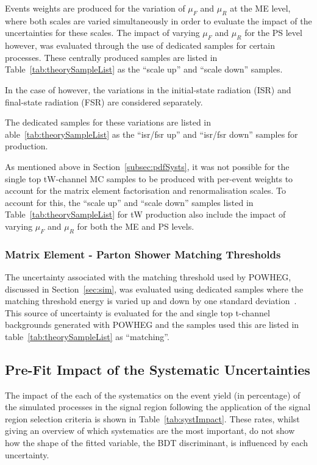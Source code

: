 Events weights are produced for the variation of $\mu_{F}$ and $\mu_{R}$ at the ME level, where both scales are varied simultaneously in order to evaluate the impact of the uncertainties for these scales.
The impact of varying $\mu_{F}$ and $\mu_{R}$ for the PS level however, was evaluated through the use of dedicated samples for certain processes.
These centrally produced samples are listed in Table~\ref{tab:theorySampleList} as the ``scale up'' and ``scale down'' samples. 

In the case of \ttbar however, the variations in the initial-state radiation (ISR) and final-state radiation (FSR) are considered separately.

The dedicated samples for these variations are listed in able~\ref{tab:theorySampleList} as the ``isr/fsr up'' and ``isr/fsr down'' samples for \ttbar production.

As mentioned above in Section~\ref{subsec:pdfSysts}, it was not possible for the single top tW-channel MC samples to be produced with per-event weights to account for the matrix element factorisation and renormalisation scales.
To account for this, the ``scale up'' and ``scale down'' samples listed in Table~\ref{tab:theorySampleList} for tW production also include the impact of varying $\mu_{F}$ and $\mu_{R}$ for both the ME and PS levels.

\subsubsection{Matrix Element - Parton Shower Matching Thresholds}
%
The uncertainty associated with the matching threshold used by POWHEG, discussed in Section~\ref{sec:sim}, was evaluated using dedicated samples where the matching threshold energy is varied up and down by one standard deviation~\cite{CMS:2016kle}.
This source of uncertainty is evaluated for the \ttbar and single top t-channel backgrounds generated with POWHEG and the samples used this are listed in table~\ref{tab:theorySampleList} as ``matching''.

\subsection{Pre-Fit Impact of the Systematic Uncertainties}\label{sec:uncertainitiesPreFitImpact}
The impact of the each of the systematics on the event yield (in percentage) of the simulated processes in the signal region following the application of the signal region selection criteria is shown in Table~\ref{tab:systImpact}.
These rates, whilst giving an overview of which systematics are the most important, do not show how the shape of the fitted variable, the BDT discriminant, is influenced by each uncertainty.

